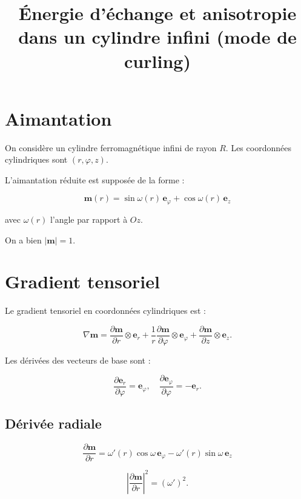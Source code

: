 \documentclass[11pt,a4paper]{article}
\title{Énergie d'échange et anisotropie dans un cylindre infini (mode de curling)}
\author{}
\date{}
\begin{document}
\maketitle


\section{Aimantation}

On considère un cylindre ferromagnétique infini de rayon $R$.
Les coordonnées cylindriques sont $(r,\varphi,z)$.

L'aimantation réduite est supposée de la forme :

\[
\boxed{
\mathbf m(r)
=
\sin\omega(r)\,\mathbf e_\varphi
+
\cos\omega(r)\,\mathbf e_z
}
\]

avec $\omega(r)$ l'angle par rapport à $Oz$.

On a bien $|\mathbf m|=1$.


\section{Gradient tensoriel}

Le gradient tensoriel en coordonnées cylindriques est :

\[
\nabla\mathbf m
=
\frac{\partial\mathbf m}{\partial r}\otimes\mathbf e_r
+
\frac1r\frac{\partial\mathbf m}{\partial\varphi}\otimes\mathbf e_\varphi
+
\frac{\partial\mathbf m}{\partial z}\otimes\mathbf e_z.
\]

Les dérivées des vecteurs de base sont :

\[
\frac{\partial\mathbf e_r}{\partial\varphi}=\mathbf e_\varphi,\quad
\frac{\partial\mathbf e_\varphi}{\partial\varphi}=-\mathbf e_r.
\]


\subsection{Dérivée radiale}

\[
\frac{\partial\mathbf m}{\partial r}
=
\omega'(r)\cos\omega\,\mathbf e_\varphi
-
\omega'(r)\sin\omega\,\mathbf e_z
\]

\[
\left|\frac{\partial\mathbf m}{\partial r}\right|^2=(\omega')^2.
\]
\end{document}
